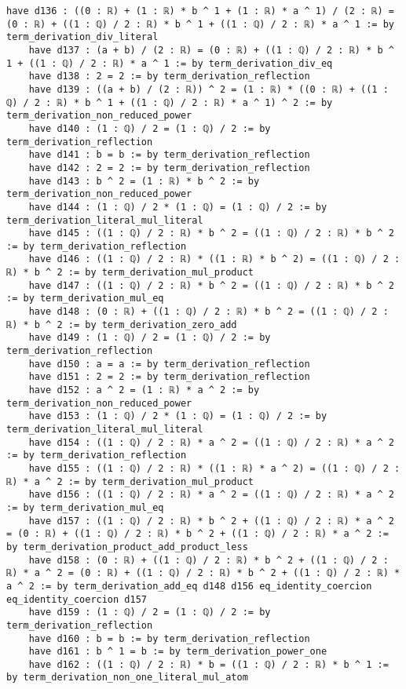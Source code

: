 \documentclass{article}
\begin{document}
\begin{tcolorbox}[colback=white!10, width=\linewidth]
\begin{lstlisting}[language=Lean4]
    have d136 : ((0 : ℝ) + (1 : ℝ) * b ^ 1 + (1 : ℝ) * a ^ 1) / (2 : ℝ) = (0 : ℝ) + ((1 : ℚ) / 2 : ℝ) * b ^ 1 + ((1 : ℚ) / 2 : ℝ) * a ^ 1 := by term_derivation_div_literal
    have d137 : (a + b) / (2 : ℝ) = (0 : ℝ) + ((1 : ℚ) / 2 : ℝ) * b ^ 1 + ((1 : ℚ) / 2 : ℝ) * a ^ 1 := by term_derivation_div_eq
    have d138 : 2 = 2 := by term_derivation_reflection
    have d139 : ((a + b) / (2 : ℝ)) ^ 2 = (1 : ℝ) * ((0 : ℝ) + ((1 : ℚ) / 2 : ℝ) * b ^ 1 + ((1 : ℚ) / 2 : ℝ) * a ^ 1) ^ 2 := by term_derivation_non_reduced_power
    have d140 : (1 : ℚ) / 2 = (1 : ℚ) / 2 := by term_derivation_reflection
    have d141 : b = b := by term_derivation_reflection
    have d142 : 2 = 2 := by term_derivation_reflection
    have d143 : b ^ 2 = (1 : ℝ) * b ^ 2 := by term_derivation_non_reduced_power
    have d144 : (1 : ℚ) / 2 * (1 : ℚ) = (1 : ℚ) / 2 := by term_derivation_literal_mul_literal
    have d145 : ((1 : ℚ) / 2 : ℝ) * b ^ 2 = ((1 : ℚ) / 2 : ℝ) * b ^ 2 := by term_derivation_reflection
    have d146 : ((1 : ℚ) / 2 : ℝ) * ((1 : ℝ) * b ^ 2) = ((1 : ℚ) / 2 : ℝ) * b ^ 2 := by term_derivation_mul_product
    have d147 : ((1 : ℚ) / 2 : ℝ) * b ^ 2 = ((1 : ℚ) / 2 : ℝ) * b ^ 2 := by term_derivation_mul_eq
    have d148 : (0 : ℝ) + ((1 : ℚ) / 2 : ℝ) * b ^ 2 = ((1 : ℚ) / 2 : ℝ) * b ^ 2 := by term_derivation_zero_add
    have d149 : (1 : ℚ) / 2 = (1 : ℚ) / 2 := by term_derivation_reflection
    have d150 : a = a := by term_derivation_reflection
    have d151 : 2 = 2 := by term_derivation_reflection
    have d152 : a ^ 2 = (1 : ℝ) * a ^ 2 := by term_derivation_non_reduced_power
    have d153 : (1 : ℚ) / 2 * (1 : ℚ) = (1 : ℚ) / 2 := by term_derivation_literal_mul_literal
    have d154 : ((1 : ℚ) / 2 : ℝ) * a ^ 2 = ((1 : ℚ) / 2 : ℝ) * a ^ 2 := by term_derivation_reflection
    have d155 : ((1 : ℚ) / 2 : ℝ) * ((1 : ℝ) * a ^ 2) = ((1 : ℚ) / 2 : ℝ) * a ^ 2 := by term_derivation_mul_product
    have d156 : ((1 : ℚ) / 2 : ℝ) * a ^ 2 = ((1 : ℚ) / 2 : ℝ) * a ^ 2 := by term_derivation_mul_eq
    have d157 : ((1 : ℚ) / 2 : ℝ) * b ^ 2 + ((1 : ℚ) / 2 : ℝ) * a ^ 2 = (0 : ℝ) + ((1 : ℚ) / 2 : ℝ) * b ^ 2 + ((1 : ℚ) / 2 : ℝ) * a ^ 2 := by term_derivation_product_add_product_less
    have d158 : (0 : ℝ) + ((1 : ℚ) / 2 : ℝ) * b ^ 2 + ((1 : ℚ) / 2 : ℝ) * a ^ 2 = (0 : ℝ) + ((1 : ℚ) / 2 : ℝ) * b ^ 2 + ((1 : ℚ) / 2 : ℝ) * a ^ 2 := by term_derivation_add_eq d148 d156 eq_identity_coercion eq_identity_coercion d157
    have d159 : (1 : ℚ) / 2 = (1 : ℚ) / 2 := by term_derivation_reflection
    have d160 : b = b := by term_derivation_reflection
    have d161 : b ^ 1 = b := by term_derivation_power_one
    have d162 : ((1 : ℚ) / 2 : ℝ) * b = ((1 : ℚ) / 2 : ℝ) * b ^ 1 := by term_derivation_non_one_literal_mul_atom

\end{lstlisting}
\end{tcolorbox}
\end{document}
